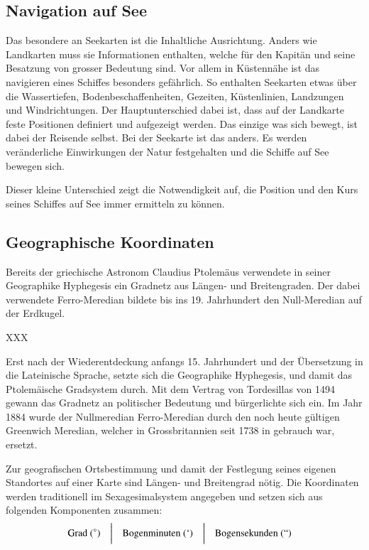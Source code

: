 \begin{refsection}
\section{Navigation auf See}
Das besondere an Seekarten ist die Inhaltliche Ausrichtung. Anders wie Landkarten muss sie Informationen enthalten, welche für den Kapitän und seine Besatzung von grosser Bedeutung sind. Vor allem in Küstennähe ist das navigieren eines Schiffes besonders gefährlich. So enthalten Seekarten etwas über die Wassertiefen, Bodenbeschaffenheiten, Gezeiten, Küstenlinien, Landzungen und Windrichtungen.
Der Hauptunterschied dabei ist, dass auf der Landkarte feste Positionen definiert und aufgezeigt werden. Das einzige was sich bewegt, ist dabei der Reisende selbst. Bei der Seekarte ist das anders. Es werden veränderliche Einwirkungen der Natur festgehalten und die Schiffe auf See bewegen sich.

Dieser kleine Unterschied zeigt die Notwendigkeit auf, die Position und den Kurs seines Schiffes auf See immer ermitteln zu können.


\subsection{Geographische Koordinaten}
Bereits der griechische Astronom Claudius Ptolemäus verwendete in seiner Geographike Hyphegesis ein Gradnetz aus Längen- und Breitengraden. Der dabei verwendete Ferro-Meredian bildete bis ins 19. Jahrhundert den Null-Meredian auf der Erdkugel. 

XXX

Erst nach der Wiederentdeckung anfangs 15. Jahrhundert und der Übersetzung in die Lateinische Sprache, setzte sich die Geographike Hyphegesis, und damit das Ptolemäische Gradsystem durch.
Mit dem Vertrag von Tordesillas von 1494 gewann das Gradnetz an politischer Bedeutung und bürgerlichte sich ein.
Im Jahr 1884 wurde der Nullmeredian Ferro-Meredian durch den noch heute gültigen Greenwich Meredian, welcher in Grossbritannien seit 1738 in gebrauch war, ersetzt.

Zur geografischen Ortsbestimmung und damit der Festlegung seines eigenen Standortes auf einer Karte sind Längen- und Breitengrad nötig. 
Die Koordinaten werden traditionell im Sexagesimalsystem angegeben und setzen sich aus folgenden Komponenten zusammen:
\[
\begin{aligned}
&\text{Grad } (^{\circ})
&
&\text{\bigg \vert}
&
&\text{Bogenminuten } (`)
&
&\text{\bigg \vert}
&
&\text{Bogensekunden } (``)
\end{aligned}
\]


\end{refsection}
